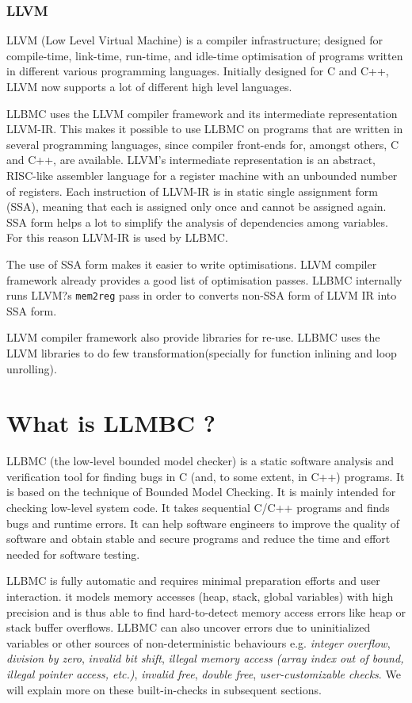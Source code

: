 \documentclass[14pt]{article}
\begin{document}
{\subsubsection*{LLVM}
LLVM (Low Level Virtual Machine)   \cite{llvm} is a compiler infrastructure; designed for compile-time, link-time, run-time, and idle-time optimisation of programs written in different various programming languages. Initially designed for C and C++, LLVM now supports a lot of different high level languages.

LLBMC uses the LLVM compiler framework and its intermediate representation LLVM-IR. This makes it possible to use LLBMC
on programs that are written in several programming languages, since compiler front-ends for, amongst others, C and C++, are available. LLVM's intermediate representation is an abstract, RISC-like assembler language for a register machine with an unbounded number of registers. Each instruction of LLVM-IR is in static single assignment form (SSA), meaning that each is assigned only once and cannot be assigned again. SSA form helps a lot to simplify the analysis of dependencies among variables. For this reason LLVM-IR is used by LLBMC.

The use of SSA form makes it easier to write optimisations. LLVM compiler framework already provides a good list of optimisation passes. LLBMC internally runs LLVM?s \texttt{mem2reg} pass in order to converts non-SSA form of LLVM IR into SSA form. 

LLVM compiler framework also provide libraries for re-use. LLBMC uses the LLVM libraries to do few transformation(specially for  function inlining and loop unrolling). 



\section{What is LLMBC ?}\label{overview_of_llbmc}
LLBMC (the low-level bounded model checker) is a static software analysis and verification tool for finding bugs in C (and, to some extent, in C++) programs. It is based on the technique of Bounded Model Checking. It is mainly intended for checking low-level system code. It takes sequential C/C++ programs and finds bugs and runtime errors. It can help 
software engineers to improve the quality of software and obtain stable and secure programs and reduce the time and effort needed for software testing. 

LLBMC is fully automatic and requires minimal preparation efforts and user interaction. it models memory accesses (heap, stack, global variables) with high precision and is thus able to find hard-to-detect memory access errors like heap or stack buffer overflows. LLBMC can also uncover errors due to uninitialized variables or other sources of non-deterministic behaviours e.g. 
\textit{integer overflow}, 
\textit{division by zero},
\textit{invalid bit shift},
\textit{illegal memory access (array index out of bound, illegal pointer access, etc.)},
\textit{invalid free},
\textit{double free},
\textit{user-customizable checks}.
We will explain more on these built-in-checks in subsequent sections. 

}
\end{document}
